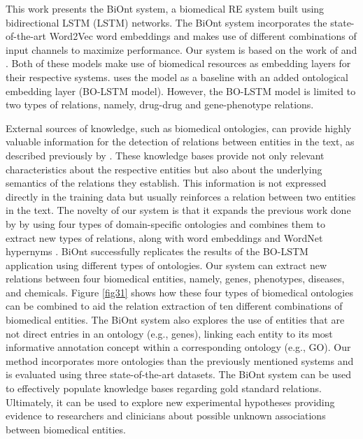 This work presents the BiOnt system, a biomedical \ac{RE} system built using bidirectional \acl{LSTM} (LSTM) networks. The BiOnt system incorporates the state-of-the-art Word2Vec word embeddings \citep{mikolov2013distributed} and makes use of different combinations of input channels to maximize performance. Our system is based on the work of \cite{lamurias2019bo} and \cite{xu2018leveraging}. Both of these models make use of biomedical resources as embedding layers for their respective systems. \cite{lamurias2019bo} uses the \cite{xu2018leveraging} model as a baseline with an added ontological embedding layer (BO-LSTM model). However, the BO-LSTM model is limited to two types of relations, namely, drug-drug and gene-phenotype relations.

External sources of knowledge, such as biomedical ontologies, can provide highly valuable information for the detection of relations between entities in the text, as described previously by \cite{lamurias2019bo}. These knowledge bases provide not only relevant characteristics about the respective entities but also about the underlying semantics of the relations they establish. This information is not expressed directly in the training data but usually reinforces a relation between two entities in the text. The novelty of our system is that it expands the previous work done by \cite{lamurias2019bo} by using four types of domain-specific ontologies and combines them to extract new types of relations, along with word embeddings \citep{mikolov2013distributed} and WordNet hypernyms \citep{ciaramita2006broad}. BiOnt successfully replicates the results of the BO-LSTM application using different types of ontologies. Our system can extract new relations between four biomedical entities, namely, genes, phenotypes, diseases, and chemicals. Figure \ref{fig31} shows how these four types of biomedical ontologies can be combined to aid the relation extraction of ten different combinations of biomedical entities. The BiOnt system also explores the use of entities that are not direct entries in an ontology (e.g., genes), linking each entity to its most informative annotation concept within a corresponding ontology (e.g., GO). Our method incorporates more ontologies than the previously mentioned systems and is evaluated using three state-of-the-art datasets. The BiOnt system can be used to effectively populate knowledge bases regarding gold standard relations. Ultimately, it can be used to explore new experimental hypotheses providing evidence to researchers and clinicians about possible unknown associations between biomedical entities.

